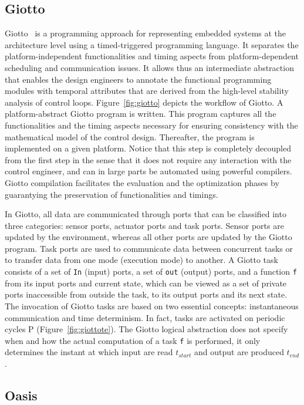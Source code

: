 \subsection{Giotto}
Giotto~\cite{intro:giotto} is a programming approach for representing embedded systems
at the architecture level using a timed-triggered programming language. It separates the
platform-independent functionalities and timing aspects from platform-dependent scheduling 
and communication issues. It allows thus an intermediate abstraction that enables the 
design engineers to annotate the functional programming modules with temporal attributes that 
are derived from the high-level stability analysis of control loops. 
Figure~\ref{fig:giotto} depicts the workflow of Giotto. A platform-abstract Giotto program
is written. This program captures all the functionalities and the timing aspects necessary
for ensuring consistency with the mathematical model of the control design. Thereafter,
the program is implemented on a given platform. Notice that this step is completely decoupled
from the first step in the sense that it does not require any interaction with the control 
engineer, and can in large parts be automated using powerful compilers. 
Giotto compilation facilitates the evaluation and the optimization phases by guarantying 
the preservation of functionalities and timings. 

In Giotto, all data are communicated through ports that can be classified into three categories:
sensor ports, actuator ports and task ports. Sensor ports are updated by the environment, 
whereas all other ports are updated by the Giotto program. Task ports are used to communicate 
data between concurrent tasks or to transfer data from one mode (execution mode) to another.
A Giotto task consists of a set of \texttt{In} (input) ports, a set of \texttt{out} (output)
ports, and a function \texttt{f} from its input ports and current state, which can be viewed
as a set of private ports inaccessible from outside the task, to its output ports
and its next state. 
The invocation of Giotto tasks are based on two essential concepts: instantaneous communication
and time determinism. In fact, tasks are activated on periodic cycles P 
(Figure~\ref{fig:giottote}). The Giotto logical abstraction 
does not specify when and how the actual computation of a task \texttt{f} is performed, 
it only determines the instant at which input are read $t_{start}$ and output are produced 
$t_{end}$.

\subsection{Oasis}

